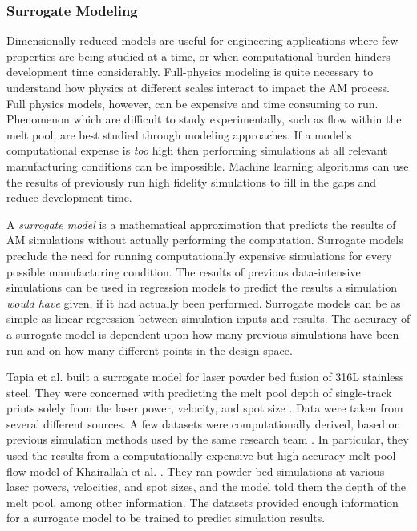 \subsubsection{Surrogate Modeling}
Dimensionally reduced models are useful for engineering applications where few properties are being studied at a time, or when computational burden hinders development time considerably. Full-physics modeling is quite necessary to understand how physics at different scales interact to impact the AM process. Full physics models, however, can be expensive and time consuming to run. Phenomenon which are difficult to study experimentally, such as flow within the melt pool, are best studied through modeling approaches. If a model's computational expense is \textit{too} high then performing simulations at all relevant manufacturing conditions can be impossible. Machine learning algorithms can use the results of previously run high fidelity simulations to fill in the gaps and reduce development time.

A \textit{surrogate model} is a mathematical approximation that predicts the results of AM simulations without actually performing the computation. Surrogate models preclude the need for running computationally expensive simulations for every possible manufacturing condition. The results of previous data-intensive simulations can be used in regression models to predict the results a simulation \textit{would have} given, if it had actually been performed. Surrogate models can be as simple as linear regression between simulation inputs and results. The accuracy of a surrogate model is dependent upon how many previous simulations have been run and on how many different points in the design space.

Tapia et al. built a surrogate model for laser powder bed fusion of 316L stainless steel. They were concerned with predicting the melt pool depth of single-track prints solely from the laser power, velocity, and spot size \cite{Tapia2017}. Data were taken from several different sources. A few datasets were computationally derived, based on previous simulation methods used by the same research team \cite{King2014}. In particular, they used the results from a computationally expensive but high-accuracy melt pool flow model of Khairallah et al. \cite{khairallah2016}. They ran powder bed simulations at various laser powers, velocities, and spot sizes, and the model told them the depth of the melt pool, among other information. The datasets provided enough information for a surrogate model to be trained to predict simulation results.


